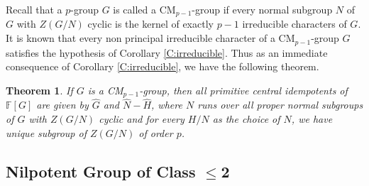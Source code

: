 \documentclass[12pt, reqno]{amsart}
\numberwithin{equation}{section}
\theoremstyle{definition}
\theoremstyle{remark}
\theoremstyle{plain}
\newtheorem{theorem}[definition]{Theorem}
\begin{document}
Recall that a $p$-group $G$ is called a CM$_{p-1}$-group if every normal subgroup $N$ of $G$ with $Z(G/N)$ cyclic is the kernel of exactly $p-1$ irreducible characters of $G$. It is known that every non principal irreducible character of a CM$_{p-1}$-group $G$ satisfies the hypothesis of Corollary \ref{C:irreducible}. Thus as an immediate consequence of Corollary \ref{C:irreducible}, we have the following theorem.
\begin{theorem}
If $G$ is a CM$_{p-1}$-group, then all primitive central idempotents of $\mathbb{F}[G]$ are given by $\widehat{G}$ and $\widehat{N}-\widehat{H}$, where $N$ runs over all proper normal subgroups of $G$ with $Z(G/N)$ cyclic and for every $H/N$ as the choice of $N$, we have unique subgroup of $Z(G/N)$ of order $p$.
\end{theorem}
\subsection{Nilpotent Group of Class $\leq$2}\smallskip
\end{document}
